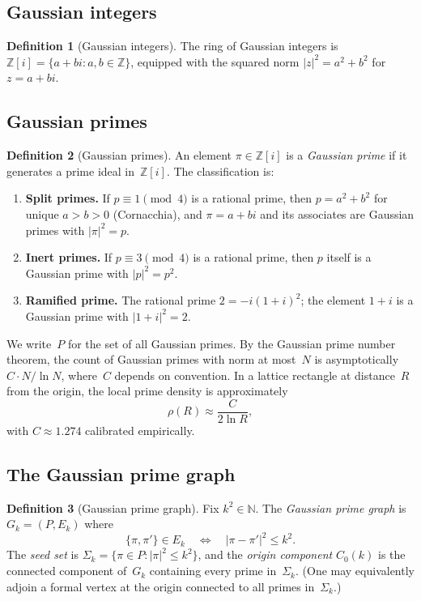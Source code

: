 \documentclass[11pt,a4paper]{article}
\newcommand{\Zi}{\mathbb{Z}[i]}
\newcommand{\Gk}{G_k}
\theoremstyle{definition}
\newtheorem{definition}{Definition}[section]
\theoremstyle{plain}
\theoremstyle{remark}
\begin{document}
\subsection{Gaussian integers}

\begin{definition}[Gaussian integers]\label{def:gaussian-integers}
The ring of Gaussian integers is $\Zi = \{a + bi : a, b \in \mathbb{Z}\}$, equipped with the squared norm $|z|^2 = a^2 + b^2$ for $z = a + bi$.
\end{definition}

\subsection{Gaussian primes}

\begin{definition}[Gaussian primes]\label{def:gaussian-primes}
An element $\pi \in \Zi$ is a \emph{Gaussian prime} if it generates a prime ideal in~$\Zi$.  The classification is:
\begin{enumerate}[label=\arabic*.]
  \item \textbf{Split primes.}  If $p \equiv 1 \pmod{4}$ is a rational prime, then $p = a^2 + b^2$ for unique $a > b > 0$ (Cornacchia), and $\pi = a + bi$ and its associates are Gaussian primes with $|\pi|^2 = p$.
  \item \textbf{Inert primes.}  If $p \equiv 3 \pmod{4}$ is a rational prime, then $p$ itself is a Gaussian prime with $|p|^2 = p^2$.
  \item \textbf{Ramified prime.}  The rational prime $2 = -i(1+i)^2$; the element $1+i$ is a Gaussian prime with $|1+i|^2 = 2$.
\end{enumerate}
\end{definition}

We write~$P$ for the set of all Gaussian primes.  By the Gaussian prime number theorem, the count of Gaussian primes with norm at most~$N$ is asymptotically $C \cdot N / \ln N$, where~$C$ depends on convention.  In a lattice rectangle at distance~$R$ from the origin, the local prime density is approximately
\[
  \rho(R) \approx \frac{C}{2\ln R},
\]
with $C \approx 1.274$ calibrated empirically.

\subsection{The Gaussian prime graph}

\begin{definition}[Gaussian prime graph]\label{def:prime-graph}
Fix $k^2 \in \mathbb{N}$.  The \emph{Gaussian prime graph} is $\Gk = (P, E_k)$ where
\[
  \{\pi, \pi'\} \in E_k \quad \Longleftrightarrow \quad |\pi - \pi'|^2 \le k^2.
\]
The \emph{seed set} is $\Sigma_k = \{\pi \in P : |\pi|^2 \le k^2\}$, and the \emph{origin component} $C_0(k)$ is the connected component of~$\Gk$ containing every prime in~$\Sigma_k$.  (One may equivalently adjoin a formal vertex at the origin connected to all primes in~$\Sigma_k$.)
\end{definition}
\end{document}
